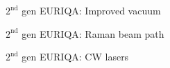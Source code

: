 \documentclass{beamer}
\begin{document}

\begin{frame}{$2^{\text{nd}}$ gen EURIQA: Improved vacuum}
  \begin{center}
    \begin{tikzpicture}
    \end{tikzpicture}
  \end{center}
\end{frame}



\begin{frame}{$2^{\text{nd}}$ gen EURIQA: Raman beam path}
  \begin{center}
    \begin{tikzpicture}
    \end{tikzpicture}
  \end{center}
\end{frame}



\begin{frame}{$2^{\text{nd}}$ gen EURIQA: CW lasers}
  \begin{center}
    \begin{tikzpicture}
    \end{tikzpicture}
  \end{center}
\end{frame}
\end{document}
